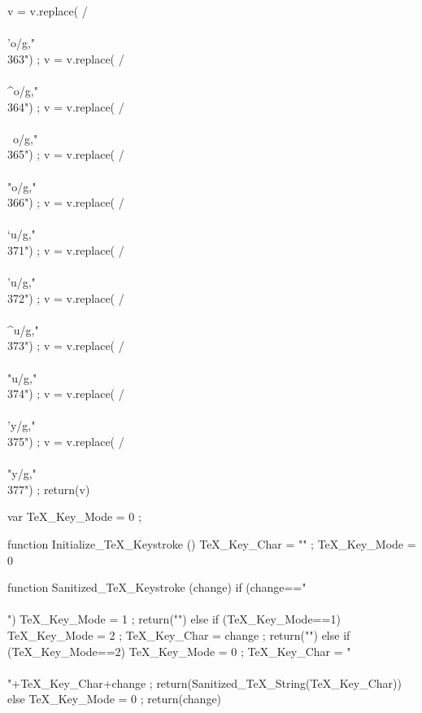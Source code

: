 {      v = v.replace(  /\\\\'o/g,"\\363") ;
      v = v.replace(  /\\\\^o/g,"\\364") ;
      v = v.replace(  /\\\\~o/g,"\\365") ;
      v = v.replace(  /\\\\"o/g,"\\366") ;
      v = v.replace(  /\\\\`u/g,"\\371") ;
      v = v.replace(  /\\\\'u/g,"\\372") ;
      v = v.replace(  /\\\\^u/g,"\\373") ;
      v = v.replace(  /\\\\"u/g,"\\374") ;
      v = v.replace(  /\\\\'y/g,"\\375") ;
      v = v.replace(  /\\\\"y/g,"\\377") ;
      return(v) }

  var TeX_Key_Mode = 0 ; 

  function Initialize_TeX_Keystroke ()
    { TeX_Key_Char = "" ;
      TeX_Key_Mode = 0 }

  function Sanitized_TeX_Keystroke (change)
    { if (change=="\\\\")
        { TeX_Key_Mode = 1 ;
          return("") }
      else if (TeX_Key_Mode==1) 
        { TeX_Key_Mode = 2 ;
          TeX_Key_Char = change ;
          return("") } 
      else if (TeX_Key_Mode==2)
        { TeX_Key_Mode = 0 ;
          TeX_Key_Char = "\\\\"+TeX_Key_Char+change ;
          return(Sanitized_TeX_String(TeX_Key_Char)) } 
      else 
        { TeX_Key_Mode = 0 ;
          return(change) } }    

